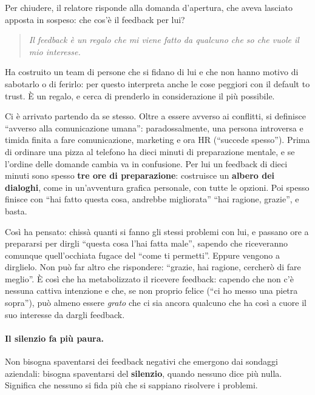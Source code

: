 Per chiudere, il relatore risponde alla domanda d'apertura, che aveva lasciato
apposta in sospeso: che cos'è il feedback per lui?

\begin{quote}
  \emph{Il feedback è un regalo che mi viene fatto da qualcuno che so che vuole
  il mio interesse.}
\end{quote}

Ha costruito un team di persone che si fidano di lui e che non hanno motivo di
sabotarlo o di ferirlo: per questo interpreta anche le cose peggiori con il
default to trust. È un regalo, e cerca di prenderlo in considerazione il più
possibile.

Ci è arrivato partendo da se stesso. Oltre a essere avverso ai conflitti, si
definisce ``avverso alla comunicazione umana'': paradossalmente, una persona
introversa e timida finita a fare comunicazione, marketing e ora HR (``succede
spesso''). Prima di ordinare una pizza al telefono ha dieci minuti di
preparazione mentale, e se l'ordine delle domande cambia va in confusione. Per
lui un feedback di dieci minuti sono spesso \textbf{tre ore di preparazione}:
costruisce un \textbf{albero dei dialoghi}, come in un'avventura grafica
personale, con tutte le opzioni. Poi spesso finisce con ``hai fatto questa
cosa, andrebbe migliorata'' ``hai ragione, grazie'', e basta.

Così ha pensato: chissà quanti si fanno gli stessi problemi con lui, e passano
ore a prepararsi per dirgli ``questa cosa l'hai fatta male'', sapendo che
riceveranno comunque quell'occhiata fugace del ``come ti permetti''. Eppure
vengono a dirglielo. Non può far altro che rispondere: ``grazie, hai ragione,
cercherò di fare meglio''. È così che ha metabolizzato il ricevere feedback:
capendo che non c'è nessuna cattiva intenzione e che, se non proprio felice
(``ci ho messo una pietra sopra''), può almeno essere \emph{grato} che ci sia
ancora qualcuno che ha così a cuore il suo interesse da dargli feedback.

\paragraph{Il silenzio fa più paura.} Non bisogna spaventarsi dei feedback
negativi che emergono dai sondaggi aziendali: bisogna spaventarsi del
\textbf{silenzio}, quando nessuno dice più nulla. Significa che nessuno si
fida più che si sappiano risolvere i problemi.

